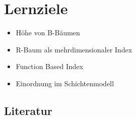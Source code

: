\section*{Lernziele}
\begin{itemize}
	\item Höhe von B-Bäumen
	\item R-Baum als mehrdimensionaler Index
	\item Function Based Index
	\item Einordnung im Schichtenmodell
\end{itemize}

\begin{normalText}
\section*{Literatur}


\GuttmanEightyfour
\end{normalText}
